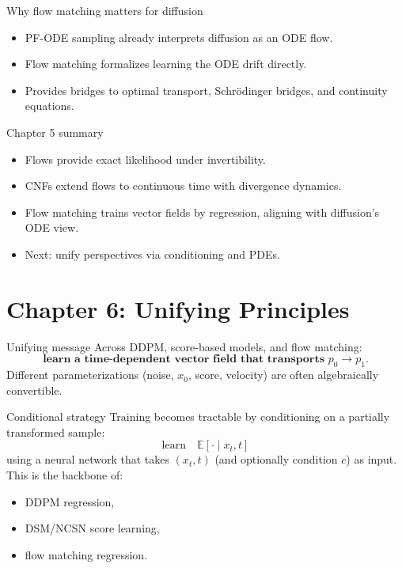 \documentclass[aspectratio=169]{beamer}
\begin{document}
\begin{frame}{Why flow matching matters for diffusion}
\begin{itemize}
\item PF-ODE sampling already interprets diffusion as an ODE flow.
\item Flow matching formalizes learning the ODE drift directly.
\item Provides bridges to optimal transport, Schr\"odinger bridges, and continuity equations.
\end{itemize}
\end{frame}

\begin{frame}{Chapter 5 summary}
\begin{itemize}
\item Flows provide exact likelihood under invertibility.
\item CNFs extend flows to continuous time with divergence dynamics.
\item Flow matching trains vector fields by regression, aligning with diffusion's ODE view.
\item Next: unify perspectives via conditioning and PDEs.
\end{itemize}
\end{frame}

\section{Chapter 6: Unifying Principles}

\begin{frame}{Unifying message}
Across DDPM, score-based models, and flow matching:
\[
\textbf{learn a time-dependent vector field that transports }p_0 \to p_1.
\]
Different parameterizations (noise, \(x_0\), score, velocity) are often algebraically convertible.
\end{frame}

\begin{frame}{Conditional strategy}
Training becomes tractable by conditioning on a partially transformed sample:
\[
\text{learn}\quad \mathbb{E}[\cdot\mid x_t,t]
\]
using a neural network that takes \((x_t,t)\) (and optionally condition \(c\)) as input.
This is the backbone of:
\begin{itemize}
\item DDPM regression,
\item DSM/NCSN score learning,
\item flow matching regression.
\end{itemize}
\end{frame}
\end{document}
